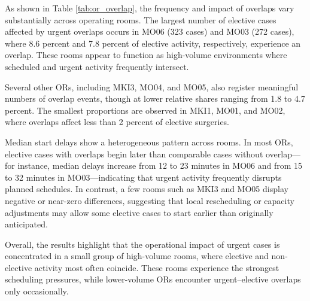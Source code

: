 \documentclass[
]{article}
\begin{document}
As shown in Table \ref{tab:or_overlap}, the frequency and impact of
overlaps vary substantially across operating rooms. The largest number
of elective cases affected by urgent overlaps occurs in MO06 (323 cases)
and MO03 (272 cases), where 8.6 percent and 7.8 percent of elective
activity, respectively, experience an overlap. These rooms appear to
function as high-volume environments where scheduled and urgent activity
frequently intersect.

Several other ORs, including MKI3, MO04, and MO05, also register
meaningful numbers of overlap events, though at lower relative shares
ranging from 1.8 to 4.7 percent. The smallest proportions are observed
in MKI1, MO01, and MO02, where overlaps affect less than 2 percent of
elective surgeries.

Median start delays show a heterogeneous pattern across rooms. In most
ORs, elective cases with overlaps begin later than comparable cases
without overlap---for instance, median delays increase from 12 to 23
minutes in MO06 and from 15 to 32 minutes in MO03---indicating that
urgent activity frequently disrupts planned schedules. In contrast, a
few rooms such as MKI3 and MO05 display negative or near-zero
differences, suggesting that local rescheduling or capacity adjustments
may allow some elective cases to start earlier than originally
anticipated.

Overall, the results highlight that the operational impact of urgent
cases is concentrated in a small group of high-volume rooms, where
elective and non-elective activity most often coincide. These rooms
experience the strongest scheduling pressures, while lower-volume ORs
encounter urgent--elective overlaps only occasionally.
\end{document}
